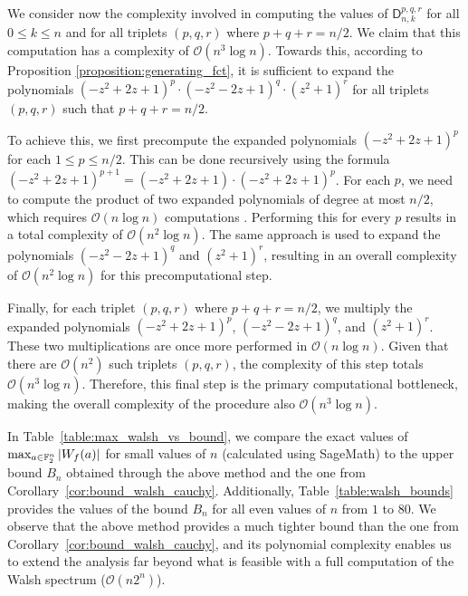 \documentclass[11pt]{llncs}
\begin{document}
We consider now the complexity involved in computing the values of $\mathsf{D}_{n,k}^{p,q,r}$ for all $0 \leq k \leq n$ and for all triplets $(p,q,r)$ where $p+q+r=n/2$. We claim that this computation has a complexity of $\mathcal{O}(n^3 \log n)$. Towards this, according to Proposition \ref{proposition:generating_fct}, it is sufficient to expand the polynomials $(-z^2 + 2z + 1)^p \cdot (-z^2 - 2z + 1)^q \cdot (z^2 + 1)^r$ for all triplets $(p,q,r)$ such that $p+q+r=n/2$.

To achieve this, we first precompute the expanded polynomials $(-z^2 + 2z + 1)^p$ for each $1 \leq p \leq n/2$. This can be done recursively using the formula $(-z^2 + 2z + 1)^{p+1} = (-z^2 + 2z + 1) \cdot (-z^2 + 2z + 1)^p$. For each $p$, we need to compute the product of two expanded polynomials of degree at most $n/2$, which requires $\mathcal{O}(n \log n)$ computations . Performing this for every $p$ results in a total complexity of $\mathcal{O}(n^2 \log n)$. The same approach is used to expand the polynomials $(-z^2 - 2z + 1)^q$ and $(z^2 + 1)^r$, resulting in an overall complexity of $\mathcal{O}(n^2 \log n)$ for this precomputational step.

Finally, for each triplet $(p,q,r)$ where $p+q+r=n/2$, we multiply the expanded polynomials $(-z^2 + 2z + 1)^p$, $(-z^2 - 2z + 1)^q$, and $(z^2 + 1)^r$. These two multiplications are once more performed in $\mathcal{O}(n \log n)$. Given that there are $\mathcal{O}(n^2)$ such triplets $(p,q,r)$, the complexity of this step totals $\mathcal{O}(n^3 \log n)$. Therefore, this final step is the primary computational bottleneck, making the overall complexity of the procedure also $\mathcal{O}(n^3 \log n)$.






In Table~\ref{table:max_walsh_vs_bound}, we compare the exact values of $\max_{a\in\mathbb F_2^n}|W_{f}(a)|$ for small values of $n$ (calculated using \textsf{SageMath}) to the upper bound $B_n$ obtained through the above method and the one from Corollary~\ref{cor:bound_walsh_cauchy}. 
Additionally, Table~\ref{table:walsh_bounds} provides the values of the bound $B_n$ for all even values of $n$ from $1$ to $80$.
We observe that the above method provides a much tighter bound than the one from Corollary~\ref{cor:bound_walsh_cauchy}, and its polynomial complexity enables us to extend the analysis far beyond what is feasible with a full computation of the Walsh spectrum (\( \mathcal{O}(n 2^n) \)).
\end{document}
